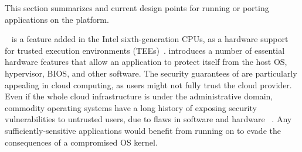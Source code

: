 
\label{sec:sgx:overview}

This section summarizes \sgx{}
and current design points for running or porting applications on the \sgx{} platform.


\label{sec:sgx:background:sgx}


\sgx{}~\cite{intelsgx} is a feature added in the Intel sixth-generation CPUs,
as a hardware support for trusted execution environments (TEEs)~\cite{santos09tccp,lie2003implementing,trustzone,amd-sme}.
\sgx{} introduces a number of essential hardware features that allow an application
to protect itself from the host OS, hypervisor, BIOS, and other software.
The security guarantees of \sgx{} are particularly appealing in cloud computing, as users 
might not fully trust the cloud provider.
Even if the whole cloud infrastructure
is under the administrative domain,
commodity operating systems have a long history of exposing security vulnerabilities
to untrusted users, due to 
flaws in software and hardware
~\cite{arbaugh00vulnerability,dirtycow,xu15ccs,liu15llc-attack,kim14rowhammer}.
Any sufficiently-sensitive applications
would benefit from running on \sgx{} to evade the consequences of a compromised OS kernel.



